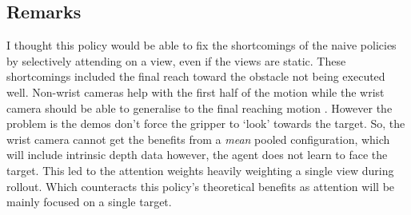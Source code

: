 \subsection{Remarks}
I thought this policy would be able to fix the shortcomings of the naive policies by selectively attending on a view, even if the views are static. These shortcomings included the final reach toward the obstacle not being executed well. Non-wrist cameras help with the first half of the motion while the wrist camera should be able to generalise to the final reaching motion . However the problem is the demos don't force the gripper to `look' towards the target. So, the wrist camera cannot get the benefits from a \emph{mean} pooled configuration, which will include intrinsic depth data however, the agent does not learn to face the target. This led to the attention weights heavily weighting a single view during rollout. Which counteracts this policy's theoretical benefits as attention will be mainly focused on a single target.

